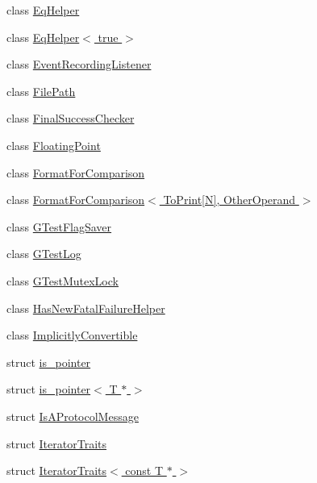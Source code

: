 \begin{DoxyCompactItemize}
\item 
class \hyperlink{classtesting_1_1internal_1_1_eq_helper}{Eq\+Helper}
\item 
class \hyperlink{classtesting_1_1internal_1_1_eq_helper_3_01true_01_4}{Eq\+Helper$<$ true $>$}
\item 
class \hyperlink{classtesting_1_1internal_1_1_event_recording_listener}{Event\+Recording\+Listener}
\item 
class \hyperlink{classtesting_1_1internal_1_1_file_path}{File\+Path}
\item 
class \hyperlink{classtesting_1_1internal_1_1_final_success_checker}{Final\+Success\+Checker}
\item 
class \hyperlink{classtesting_1_1internal_1_1_floating_point}{Floating\+Point}
\item 
class \hyperlink{classtesting_1_1internal_1_1_format_for_comparison}{Format\+For\+Comparison}
\item 
class \hyperlink{classtesting_1_1internal_1_1_format_for_comparison_3_01_to_print[_n]_00_01_other_operand_01_4}{Format\+For\+Comparison$<$ To\+Print\mbox{[}\+N\mbox{]}, Other\+Operand $>$}
\item 
class \hyperlink{classtesting_1_1internal_1_1_g_test_flag_saver}{G\+Test\+Flag\+Saver}
\item 
class \hyperlink{classtesting_1_1internal_1_1_g_test_log}{G\+Test\+Log}
\item 
class \hyperlink{classtesting_1_1internal_1_1_g_test_mutex_lock}{G\+Test\+Mutex\+Lock}
\item 
class \hyperlink{classtesting_1_1internal_1_1_has_new_fatal_failure_helper}{Has\+New\+Fatal\+Failure\+Helper}
\item 
class \hyperlink{classtesting_1_1internal_1_1_implicitly_convertible}{Implicitly\+Convertible}
\item 
struct \hyperlink{structtesting_1_1internal_1_1is__pointer}{is\+\_\+pointer}
\item 
struct \hyperlink{structtesting_1_1internal_1_1is__pointer_3_01_t_01_5_01_4}{is\+\_\+pointer$<$ T $\ast$ $>$}
\item 
struct \hyperlink{structtesting_1_1internal_1_1_is_a_protocol_message}{Is\+A\+Protocol\+Message}
\item 
struct \hyperlink{structtesting_1_1internal_1_1_iterator_traits}{Iterator\+Traits}
\item 
struct \hyperlink{structtesting_1_1internal_1_1_iterator_traits_3_01const_01_t_01_5_01_4}{Iterator\+Traits$<$ const T $\ast$ $>$}
\item 

\end{DoxyCompactItemize}
